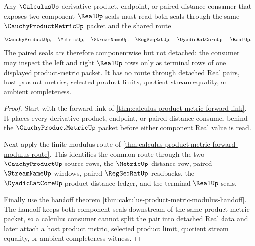 \begin{theorem}
\label{thm:calculus-product-metric-seal-pairing}
Any $\CalculusUp$ derivative-product, endpoint, or paired-distance consumer that exposes two component $\RealUp$ seals must read both seals through the same $\CauchyProductMetricUp$ packet and the shared route
$$
\CauchyProductUp,\quad
\MetricUp,\quad
\StreamNameUp,\quad
\RegSeqRatUp,\quad
\DyadicRatCoreUp,\quad
\RealUp .
$$
The paired seals are therefore componentwise but not detached: the consumer may inspect the left and right $\RealUp$ rows only as terminal rows of one displayed product-metric packet. It has no route through detached Real pairs, host product metrics, selected product limits, quotient stream equality, or ambient completeness.
\end{theorem}
\begin{proof}
Start with the forward link of \autoref{thm:calculus-product-metric-forward-link}. It places every derivative-product, endpoint, or paired-distance consumer behind the $\CauchyProductMetricUp$ packet before either component Real value is read.

Next apply the finite modulus route of \autoref{thm:calculus-product-metric-forward-modulus-route}. This identifies the common route through the two $\CauchyProductUp$ source rows, the $\MetricUp$ distance row, paired $\StreamNameUp$ windows, paired $\RegSeqRatUp$ readbacks, the $\DyadicRatCoreUp$ product-distance ledger, and the terminal $\RealUp$ seals.

Finally use the handoff theorem \autoref{thm:calculus-product-metric-modulus-handoff}. The handoff keeps both component seals downstream of the same product-metric packet, so a calculus consumer cannot split the pair into detached Real data and later attach a host product metric, selected product limit, quotient stream equality, or ambient completeness witness.
\end{proof}

